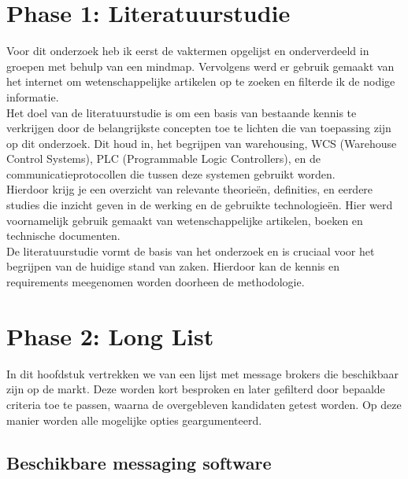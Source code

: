 \section{Phase 1: Literatuurstudie}
Voor dit onderzoek heb ik eerst de vaktermen opgelijst en onderverdeeld in groepen met behulp van een mindmap.
Vervolgens werd er gebruik gemaakt van het internet om wetenschappelijke artikelen op te zoeken en filterde ik de nodige informatie.
\\
Het doel van de literatuurstudie is om een basis van bestaande kennis te verkrijgen door de belangrijkste concepten toe te lichten die van toepassing zijn op dit onderzoek. 
Dit houd in, het begrijpen van warehousing, WCS (Warehouse Control Systems), PLC (Programmable Logic Controllers), en de communicatieprotocollen die tussen deze systemen gebruikt worden.
\\
Hierdoor krijg je een overzicht van relevante theorieën, definities, en eerdere studies die inzicht geven in de werking en de gebruikte technologieën.
Hier werd voornamelijk gebruik gemaakt van wetenschappelijke artikelen, boeken en technische documenten.
\\
De literatuurstudie vormt de basis van het onderzoek en is cruciaal voor het begrijpen van de huidige stand van zaken.
Hierdoor kan de kennis en requirements meegenomen worden doorheen de methodologie.

\section{Phase 2: Long List}
In dit hoofdstuk vertrekken we van een lijst met message brokers die beschikbaar zijn op de markt.
Deze worden kort besproken en later gefilterd door bepaalde criteria toe te passen, waarna de overgebleven kandidaten getest worden.
Op deze manier worden alle mogelijke opties geargumenteerd.

\subsection{Beschikbare messaging software}

